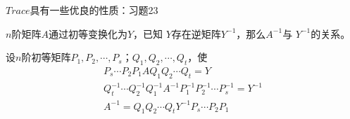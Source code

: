 \documentclass{article}
\begin{document}
\begin{zremark}
  $Trace$具有一些优良的性质：习题23
\end{zremark}

\begin{zremark}
  $n$阶矩阵$A$通过初等变换化为$Y$，已知
  $Y$存在逆矩阵$Y^{-1}$，那么$A^{-1}$与
  $Y^{-1}$的关系。
\end{zremark}

设$n$阶初等矩阵$P_1, P_2, \cdots, P_s$；$Q_1, Q_2, \cdots, Q_t$，使
\begin{align*}
  P_s \cdots P_2 P_1 A Q_1 Q_2 \cdots Q_t = Y                                         \\
  Q_t^{-1} \cdots Q_2^{-1} Q_1^{-1} A^{-1} P_1^{-1} P_2^{-1} \cdots P_s^{-1} = Y^{-1} \\
  A^{-1} = Q_1 Q_2 \cdots Q_t Y^{-1} P_s \cdots P_2P_1
\end{align*}
\end{document}
